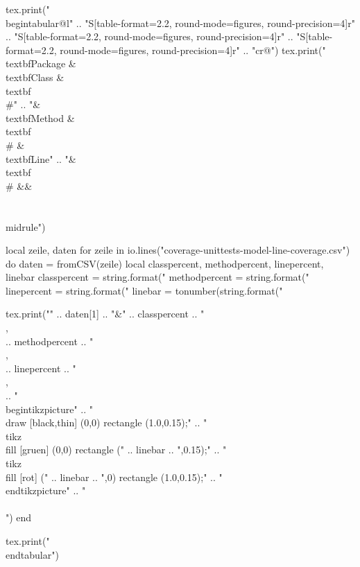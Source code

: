 \documentclass[landscape]{article}
\begin{document}
\begin{luacode}
tex.print("\\begin{tabular}{@{}l"
  .. "S[table-format=2.2, round-mode=figures, round-precision=4]r"
  .. "S[table-format=2.2, round-mode=figures, round-precision=4]r"
  .. "S[table-format=2.2, round-mode=figures, round-precision=4]r"
  .. "cr@{}}")
tex.print("\\textbf{Package} & \\textbf{Class} & \\textbf{\\#}"
  .. "& \\textbf{Method} & \\textbf{\\#} & \\textbf{Line}"
  .. "& \\textbf{\\#} && \\\\\\midrule")

local zeile, daten
for zeile in io.lines("coverage-unittests-model-line-coverage.csv") do
  daten = fromCSV(zeile)
  local classpercent, methodpercent, linepercent, linebar
  classpercent = string.format("%
  methodpercent = string.format("%
  linepercent = string.format("%
  linebar = tonumber(string.format("%

  tex.print("" .. daten[1] .. "&"
    .. classpercent .. "\\,\\%
    .. methodpercent .. "\\,\\%
    .. linepercent .. "\\,\\%
    .. "\\begin{tikzpicture}"
    .. "\\draw [black,thin] (0,0) rectangle (1.0,0.15);"
    .. "\\tikz \\fill [gruen] (0,0) rectangle (" .. linebar .. ",0.15);"
    .. "\\tikz \\fill [rot] (" .. linebar .. ",0) rectangle (1.0,0.15);"
    .. "\\end{tikzpicture}"
    .. "\\\\")
end

tex.print("\\end{tabular}")
\end{luacode}
\end{document}
